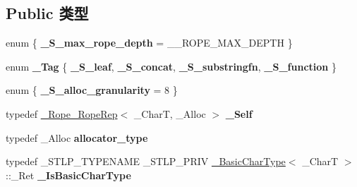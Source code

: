 \subsection*{Public 类型}
\begin{DoxyCompactItemize}
\item 
\mbox{\label{struct___rope___rope_rep_a1757b4dc84d05bd38356e6b0ddf07c30}} 
enum \{ {\bfseries \+\_\+\+S\+\_\+max\+\_\+rope\+\_\+depth} = \+\_\+\+\_\+\+R\+O\+P\+E\+\_\+\+M\+A\+X\+\_\+\+D\+E\+P\+TH
 \}
\item 
\mbox{\label{struct___rope___rope_rep_ab707d6ee3822eabec2929f0de0823184}} 
enum {\bfseries \+\_\+\+Tag} \{ {\bfseries \+\_\+\+S\+\_\+leaf}, 
{\bfseries \+\_\+\+S\+\_\+concat}, 
{\bfseries \+\_\+\+S\+\_\+substringfn}, 
{\bfseries \+\_\+\+S\+\_\+function}
 \}
\item 
\mbox{\label{struct___rope___rope_rep_ac99dad0dcd64da637f4c55a28a8e2b7d}} 
enum \{ {\bfseries \+\_\+\+S\+\_\+alloc\+\_\+granularity} = 8
 \}
\item 
\mbox{\label{struct___rope___rope_rep_a252aae689e4f22c5e0db177e95bc2c55}} 
typedef \hyperlink{struct___rope___rope_rep}{\+\_\+\+Rope\+\_\+\+Rope\+Rep}$<$ \+\_\+\+CharT, \+\_\+\+Alloc $>$ {\bfseries \+\_\+\+Self}
\item 
\mbox{\label{struct___rope___rope_rep_a8c6a1ace4f1ce5afb26b90b6f6156214}} 
typedef \+\_\+\+Alloc {\bfseries allocator\+\_\+type}
\item 
\mbox{\label{struct___rope___rope_rep_af893a960ed6ea88c1874b6168e2d8d7c}} 
typedef \+\_\+\+S\+T\+L\+P\+\_\+\+T\+Y\+P\+E\+N\+A\+ME \+\_\+\+S\+T\+L\+P\+\_\+\+P\+R\+IV \hyperlink{struct___basic_char_type}{\+\_\+\+Basic\+Char\+Type}$<$ \+\_\+\+CharT $>$\+::\+\_\+\+Ret {\bfseries \+\_\+\+Is\+Basic\+Char\+Type}
\end{DoxyCompactItemize}

